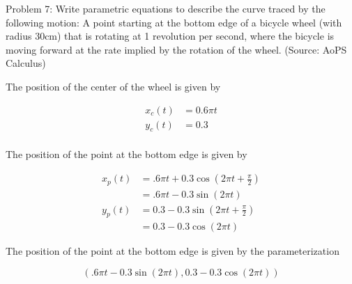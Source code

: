 Problem 7: Write parametric equations to describe the curve traced by the following motion: A point starting at the bottom edge of a bicycle wheel (with radius 30cm) that is rotating at 1 revolution per second, where the bicycle is moving forward at the rate implied by the rotation of the wheel. (Source: AoPS Calculus)

The position of the center of the wheel is given by

\begin{align*}
x_c(t) &= 0.6 \pi t \\
y_c(t) &= 0.3 \\
\end{align*}

The position of the point at the bottom edge is given by

\begin{align*}
x_p(t) &= .6 \pi t + 0.3 \cos \left(2 \pi t + \frac{\pi}{2}\right) \\
&= .6 \pi t - 0.3 \sin (2 \pi t) \\
y_p(t) &= 0.3 - 0.3 \sin \left(2 \pi t + \frac{\pi}{2}\right) \\
&= 0.3 - 0.3 \cos (2 \pi t)
\end{align*}

The position of the point at the bottom edge is given by the parameterization

$$ \boxed{\left( .6 \pi t - 0.3 \sin (2 \pi t), 0.3 - 0.3 \cos (2 \pi t) \right)} $$
